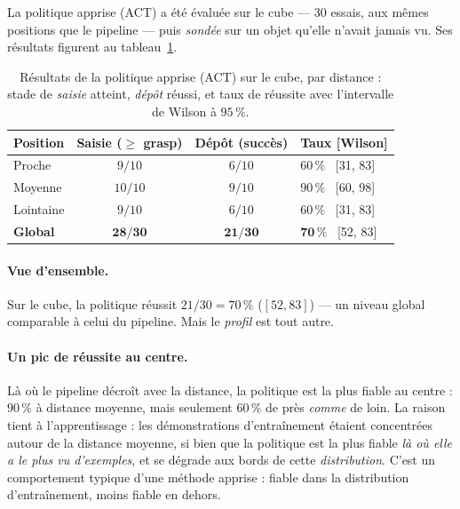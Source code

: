 La politique apprise (ACT) a été évaluée sur le cube --- $30$ essais, aux mêmes positions que le pipeline --- puis \emph{sondée} sur un objet qu'elle n'avait jamais vu. Ses résultats figurent au tableau~\ref{tab:il-results}.

\begin{table}[H]
  \centering
  \caption{Résultats de la politique apprise (ACT) sur le cube, par distance : stade de \emph{saisie} atteint, \emph{dépôt} réussi, et taux de réussite avec l'intervalle de Wilson à $95\,\%$.}
  \label{tab:il-results}
  {\small
  \begin{tabular}{lccl}
    \toprule
    Position & Saisie ($\geq$ grasp) & Dépôt (succès) & Taux [Wilson] \\
    \midrule
    Proche    & $9/10$  & $6/10$ & $60\,\%$ \, [31, 83] \\
    Moyenne   & $10/10$ & $9/10$ & $90\,\%$ \, [60, 98] \\
    Lointaine & $9/10$  & $6/10$ & $60\,\%$ \, [31, 83] \\
    \midrule
    \textbf{Global} & $\mathbf{28/30}$ & $\mathbf{21/30}$ & $\mathbf{70\,\%}$ \, [52, 83] \\
    \bottomrule
  \end{tabular}}
\end{table}

\paragraph{Vue d'ensemble.} Sur le cube, la politique réussit $21/30 = 70\,\%$ ($[52, 83]$) --- un niveau global comparable à celui du pipeline. Mais le \emph{profil} est tout autre.

\paragraph{Un pic de réussite au centre.} Là où le pipeline décroît avec la distance, la politique est la plus fiable au centre : $90\,\%$ à distance moyenne, mais seulement $60\,\%$ de près \emph{comme} de loin. La raison tient à l'apprentissage : les démonstrations d'entraînement étaient concentrées autour de la distance moyenne, si bien que la politique est la plus fiable \emph{là où elle a le plus vu d'exemples}, et se dégrade aux bords de cette \emph{distribution}. C'est un comportement typique d'une méthode apprise : fiable dans la distribution d'entraînement, moins fiable en dehors.


